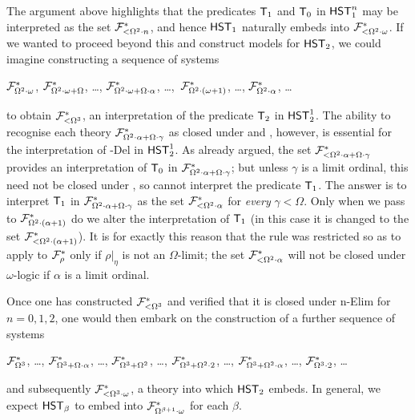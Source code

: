 \documentclass[UKenglish,cleveref,DIV=12]{scrartcl}
\theoremstyle{definition}
\theoremstyle{definition}
\begin{document}
The argument above highlights that the predicates $\mathsf{T}_1$ and $\mathsf{T}_0$ in $\mathsf{HST}_1^n$ may be
interpreted as the set $\mathcal{F}^*_{<\Omega^2\cdot n}$, and hence $\mathsf{HST}_1$ naturally
embeds into $\mathcal{F}^*_{<\Omega^2\cdot\omega}$. If we wanted to proceed beyond this
and construct models for $\mathsf{HST}_2$, we could imagine constructing a sequence of
systems
\begin{center}
  $\mathcal{F}^*_{\Omega^2\cdot\omega}$, $\mathcal{F}^*_{\Omega^2\cdot\omega+\Omega}$, \dots,
  $\mathcal{F}^*_{\Omega^2\cdot\omega+\Omega\cdot \alpha}$, \dots,\,
  $\mathcal{F}^*_{\Omega^2\cdot(\omega+1)}$, \dots,
  $\mathcal{F}^*_{\Omega^2\cdot\alpha}$, \dots%
\end{center}
to obtain $\mathcal{F}^*_{<\Omega^3}$,
an interpretation of the predicate $\mathsf{T}_2$ in $\mathsf{HST}_2^1$. The ability to recognise
each theory $\mathcal{F}^*_{\Omega^2\cdot\alpha+\Omega\cdot \gamma}$ as closed under  and
, however, is essential for the interpretation of -Del in
$\mathsf{HST}_2^1$. As already argued, the set $\mathcal{F}^*_{<\Omega^2\cdot\alpha+\Omega\cdot \gamma}$
provides an interpretation of $\mathsf{T}_0$ in $\mathcal{F}^*_{\Omega^2\cdot\alpha+\Omega\cdot \gamma}$; but
unless $\gamma$ is a limit ordinal, this need not be closed under , so cannot
interpret the predicate $\mathsf{T}_1$. The answer is to interpret $\mathsf{T}_1$ in
$\mathcal{F}^*_{\Omega^2\cdot\alpha+\Omega\cdot \gamma}$ as the set
$\mathcal{F}^*_{<\Omega^2\cdot\alpha}$ for {\em every} $\gamma<\Omega$. Only when we
pass to $\mathcal{F}^*_{\Omega^2\cdot(\alpha+1)}$ do we alter the
interpretation of $\mathsf{T}_1$ (in this case it is changed to the set
$\mathcal{F}^*_{<\Omega^2\cdot(\alpha+1)}$). It is for exactly this reason that the rule
\Uni\eta was restricted so as to apply to $\mathcal{F}^*_\rho$ only if
$\rho|_\eta$ is not an $\Omega$-limit; the set $\mathcal{F}^*_{<\Omega^2\cdot\alpha}$ will
not be closed under $\omega$-logic if $\alpha$ is a limit ordinal.

Once one has constructed $\mathcal{F}^*_{<\Omega^3}$ and verified that it is closed
under \textT n-Elim for $n=0,1,2$, one would then embark on the construction of
a further sequence of systems
\begin{center}
$\mathcal{F}^*_{\Omega^3}$,  \dots, %
$\mathcal{F}^*_{\Omega^3+\Omega\cdot \alpha}$, \dots, %
$\mathcal{F}^*_{\Omega^3+\Omega^2}$, \dots, $\mathcal{F}^*_{\Omega^3+\Omega^2\cdot2}$, \dots,
$\mathcal{F}^*_{\Omega^3+\Omega^2\cdot\alpha}$, \dots, $\mathcal{F}^*_{\Omega^3\cdot2}$, \dots
\end{center}
and subsequently $\mathcal{F}^*_{<\Omega^3\cdot\omega}$, a theory into which $\mathsf{HST}_2$ embeds.
%
In general, we expect $\mathsf{HST}_\beta$ to embed into $\mathcal{F}^*_{\Omega^{\beta+1}\cdot\omega}$ for each $\beta$.
\end{document}
